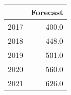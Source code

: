 \begin{tabular}{lr}
\toprule
{} &  Forecast \\
\midrule
2017 &     400.0 \\
2018 &     448.0 \\
2019 &     501.0 \\
2020 &     560.0 \\
2021 &     626.0 \\
\bottomrule
\end{tabular}
